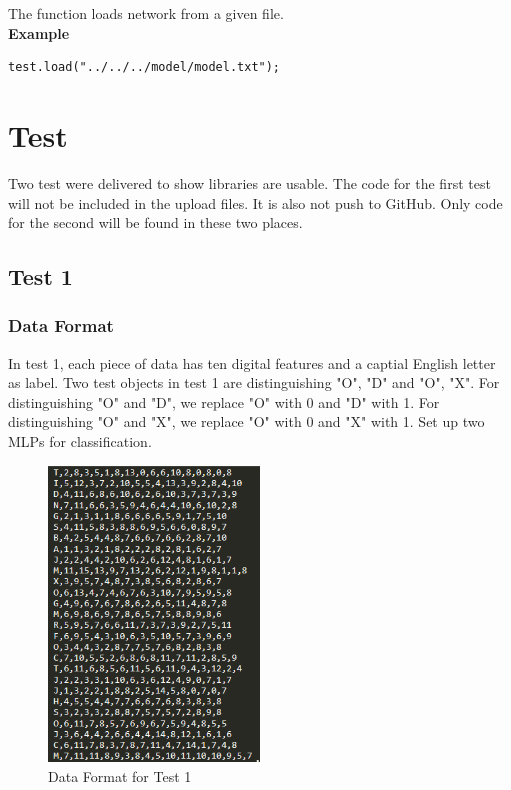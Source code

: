 \documentclass[a4paper]{article}
\begin{document}
The function loads network from a given file.\\
\textbf{Example}
\begin{lstlisting}[language={[ANSI]C++},keywordstyle=\color{blue!70},commentstyle=\color{red!50!green!50!blue!50},frame=shadowbox, rulesepcolor=\color{red!20!green!20!blue!20}]
test.load("../../../model/model.txt");
\end{lstlisting}
\section{Test}
Two test were delivered to show libraries are usable. The code for the first test will not be included in the upload files. It is also not push to GitHub. Only code for the second will be found in these two places. 
\subsection{Test 1}
\subsubsection{Data Format}
In test 1, each piece of data has ten digital features and a captial English letter as label. Two test objects in test 1 are distinguishing "O", "D" and "O", "X". For distinguishing "O" and "D", we replace "O" with 0 and "D" with 1. For distinguishing "O" and "X", we replace "O" with 0 and "X" with 1. Set up two MLPs for classification.
\begin{figure}[H]
\centering
\includegraphics[width=0.5\textwidth]{data.png}
\caption{\label{fig:frog}Data Format for Test 1}
\end{figure}
\end{document}
